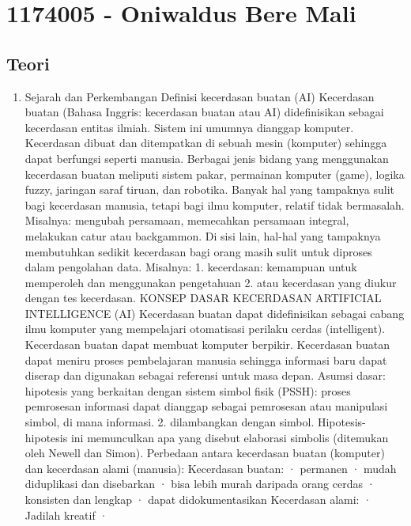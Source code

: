 ﻿\section{1174005 - Oniwaldus Bere Mali}
\subsection{Teori}
\begin{enumerate}

\item Sejarah dan Perkembangan
	\hfill\break
	Definisi kecerdasan buatan (AI) Kecerdasan buatan (Bahasa Inggris: kecerdasan buatan atau AI) didefinisikan sebagai kecerdasan entitas ilmiah. Sistem ini umumnya dianggap komputer. Kecerdasan dibuat dan ditempatkan di sebuah mesin (komputer) sehingga dapat berfungsi seperti manusia. Berbagai jenis bidang yang menggunakan kecerdasan buatan meliputi sistem pakar, permainan komputer (game), logika fuzzy, jaringan saraf tiruan, dan robotika. Banyak hal yang tampaknya sulit bagi kecerdasan manusia, tetapi bagi ilmu komputer, relatif tidak bermasalah. Misalnya: mengubah persamaan, memecahkan persamaan integral, melakukan catur atau backgammon. Di sisi lain, hal-hal yang tampaknya membutuhkan sedikit kecerdasan bagi orang masih sulit untuk diproses dalam pengolahan data. Misalnya: 1. kecerdasan: kemampuan untuk memperoleh dan menggunakan pengetahuan 2. atau kecerdasan yang diukur dengan tes kecerdasan. KONSEP DASAR KECERDASAN ARTIFICIAL INTELLIGENCE (AI) Kecerdasan buatan dapat didefinisikan sebagai cabang ilmu komputer yang mempelajari otomatisasi perilaku cerdas (intelligent). Kecerdasan buatan dapat membuat komputer berpikir. Kecerdasan buatan dapat meniru proses pembelajaran manusia sehingga informasi baru dapat diserap dan digunakan sebagai referensi untuk masa depan. Asumsi dasar: hipotesis yang berkaitan dengan sistem simbol fisik (PSSH): proses pemrosesan informasi dapat dianggap sebagai pemrosesan atau manipulasi simbol, di mana informasi. 2. dilambangkan dengan simbol. Hipotesis-hipotesis ini memunculkan apa yang disebut elaborasi simbolis (ditemukan oleh Newell dan Simon). Perbedaan antara kecerdasan buatan (komputer) dan kecerdasan alami (manusia): Kecerdasan buatan: · permanen · mudah diduplikasi dan disebarkan · bisa lebih murah daripada orang cerdas · konsisten dan lengkap · dapat didokumentasikan Kecerdasan alami: · Jadilah kreatif · 
	

\end{enumerate}
